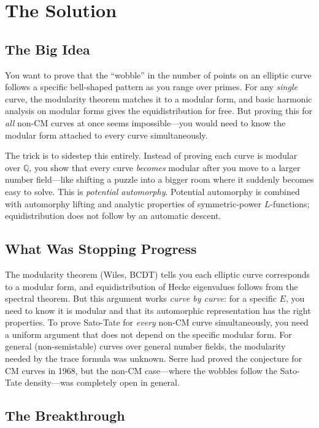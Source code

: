 \section{The Solution}

\subsection{The Big Idea}

You want to prove that the ``wobble'' in the number of points on an elliptic curve follows a specific bell-shaped pattern as you range over primes. For any \emph{single} curve, the modularity theorem matches it to a modular form, and basic harmonic analysis on modular forms gives the equidistribution for free. But proving this for \emph{all} non-CM curves at once seems impossible---you would need to know the modular form attached to every curve simultaneously.

The trick is to sidestep this entirely. Instead of proving each curve is modular over $\mathbb{Q}$, you show that every curve \emph{becomes} modular after you move to a larger number field---like shifting a puzzle into a bigger room where it suddenly becomes easy to solve. This is \emph{potential automorphy}. Potential automorphy is combined with automorphy lifting and analytic properties of symmetric-power $L$-functions; equidistribution does not follow by an automatic descent.

\subsection{What Was Stopping Progress}

The modularity theorem (Wiles, BCDT) tells you each elliptic curve corresponds to a modular form, and equidistribution of Hecke eigenvalues follows from the spectral theorem. But this argument works \emph{curve by curve}: for a specific $E$, you need to know it is modular and that its automorphic representation has the right properties. To prove Sato-Tate for \emph{every} non-CM curve simultaneously, you need a uniform argument that does not depend on the specific modular form. For general (non-semistable) curves over general number fields, the modularity needed by the trace formula was unknown. Serre had proved the conjecture for CM curves in 1968, but the non-CM case---where the wobbles follow the Sato-Tate density---was completely open in general.

\subsection{The Breakthrough}

